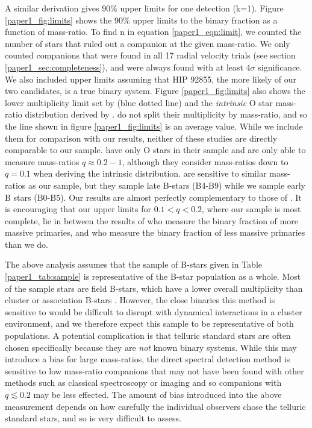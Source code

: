 A similar derivation gives $90\%$ upper limits for one detection (k=1).
Figure \ref{paper1_fig:limits} shows the $90\%$ upper limits to the binary
fraction as a function of mass-ratio. To find n in equation
\ref{paper1_eqn:limit}, we counted the number of stars that ruled out a
companion at the given mass-ratio. We only counted companions that
were found in all 17 radial velocity trials (see section
\ref{paper1_sec:completeness}), and were always found with at least $4\sigma$
significance. We also included upper limits assuming that HIP 92855, the more likely of our two candidates, is
a true binary system. Figure \ref{paper1_fig:limits} also shows the lower
multiplicity limit set by \cite{Evans2011} (blue dotted line) and the
\emph{intrinsic} O star mass-ratio distribution derived by
\cite{Sana2012}. \cite{Evans2011} do not split their multiplicity by mass-ratio,
and so the line shown in figure \ref{paper1_fig:limits} is an average value. While
we include them for comparison with our results, neither of these studies are
directly comparable to our sample. \cite{Sana2012} have only O stars in
their sample and are only able to measure mass-ratios $q\approx
0.2-1$, although they consider mass-ratios down to $q=0.1$
when deriving the intrinsic distribution. \cite{Evans2011} are sensitive to similar mass-ratios as our
sample, but they sample late B-stars (B4-B9) while we sample early B
stars (B0-B5). Our results are almost perfectly complementary to those of \cite{Evans2011}. It
is encouraging that our upper limits for $0.1<q<0.2$, where our sample
is most complete, lie in between the results of
\cite{Sana2012} who measure the binary fraction of more massive
primaries, and \cite{Evans2011} who measure the binary fraction of
less massive primaries than we do.

The above analysis assumes that the sample of B-stars given in Table
\ref{paper1_tab:sample} is representative of the B-star population as a
whole. Most of the sample stars are field
B-stars, which have a lower overall multiplicity than cluster or
association B-stars \citep{Mason2009}. However, the close binaries this
method is sensitive to would be difficult to disrupt with dynamical
interactions in a cluster environment, and we therefore expect this
sample to be representative of both populations. A potential complication is that telluric standard stars are often chosen specifically because they are \emph{not} known binary systems. While this may introduce a bias for large mass-ratios, the direct spectral detection method is sensitive to low mass-ratio companions that may not have been found with other methods such as classical spectroscopy or imaging and so companions with $q \lesssim 0.2$ may be less effected. The amount of bias introduced into the above measurement depends on how carefully the individual observers chose the telluric standard stars, and so is very difficult to assess.



